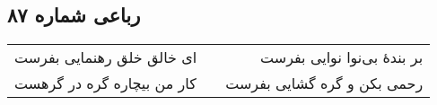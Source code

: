 \begin{center}
\section*{رباعی شماره ۸۷}
\label{sec:sh087}
\begin{longtable}{l p{0.5cm} r}
ای خالق خلق رهنمایی بفرست
&&
بر بندهٔ بی‌نوا نوایی بفرست
\\
کار من بیچاره گره در گرهست
&&
رحمی بکن و گره گشایی بفرست
\\
\end{longtable}
\end{center}
